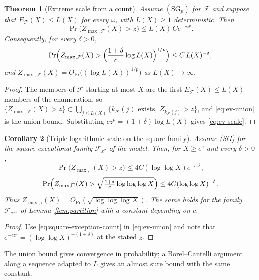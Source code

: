 \documentclass[11pt]{amsart}
\numberwithin{equation}{section}
\theoremstyle{plain}
\newtheorem{theorem}{Theorem}[section]
\newtheorem{corollary}[theorem]{Corollary}
\theoremstyle{definition}
\theoremstyle{remark}
\newcommand{\F}{\mathcal{F}}
\begin{document}
\begin{theorem}[Extreme scale from a count]
\label{thm:ev-union}
Assume $(\mathrm{SG}_p)$ for $\F$ and suppose that $E_\F(X)\le L(X)$ for
every $\omega$, with $L(X)\ge1$ deterministic. Then
\begin{equation}
\label{eq:ev-union}
\Pr\bigl(Z_{\max,\F}(X)>z\bigr)\le L(X)\,Ce^{-cz^p}.
\end{equation}
Consequently, for every $\delta>0$,
\begin{equation}
\label{eq:ev-scale}
\Pr\Bigl(Z_{\max,\F}(X)>\Bigl(\frac{1+\delta}{c}\log L(X)\Bigr)^{1/p}\Bigr)
\le C\,L(X)^{-\delta},
\end{equation}
and $Z_{\max,\F}(X)=O_{\Pr}\bigl((\log L(X))^{1/p}\bigr)$ as $L(X)\to\infty$.
\end{theorem}

\begin{proof}
The members of $\F$ starting at most $X$ are the first $E_\F(X)\le L(X)$
members of the enumeration, so
$\{Z_{\max,\F}(X)>z\}\subset\bigcup_{j\le L(X)}\{k_\F(j)\text{ exists},\
Z_{k_\F(j)}>z\}$, and \eqref{eq:ev-union} is the union bound. Substituting
$cz^p=(1+\delta)\log L(X)$ gives \eqref{eq:ev-scale}.
\end{proof}

\begin{corollary}[Triple-logarithmic scale on the square family]
\label{cor:ev-square}
Assume (SG) for the square-exceptional family $\F_{x^2}$ of the model. Then,
for $X\ge e^e$ and every $\delta>0$,
\begin{equation}
\label{eq:ev-square}
\Pr\bigl(Z_{\max,\square}(X)>z\bigr)\le4C(\log\log X)e^{-cz^2},
\end{equation}
\begin{equation}
\label{eq:ev-square-b}
\Pr\Bigl(Z_{\max,\square}(X)>\sqrt{\tfrac{1+\delta}{c}\log\log\log X}\Bigr)
\le4C(\log\log X)^{-\delta}.
\end{equation}
Thus $Z_{\max,\square}(X)=O_{\Pr}(\sqrt{\log\log\log X})$. The same holds for
the family $\F_{cx^2}$ of Lemma~\ref{lem:partition} with a constant depending
on $c$.
\end{corollary}

\begin{proof}
Use \eqref{eq:square-exception-count} in \eqref{eq:ev-union} and note that
$e^{-cz^2}=(\log\log X)^{-(1+\delta)}$ at the stated $z$.
\end{proof}

The union bound gives convergence in probability; a Borel--Cantelli argument
along a sequence adapted to $L$ gives an almost sure bound with the same
constant.
\end{document}
